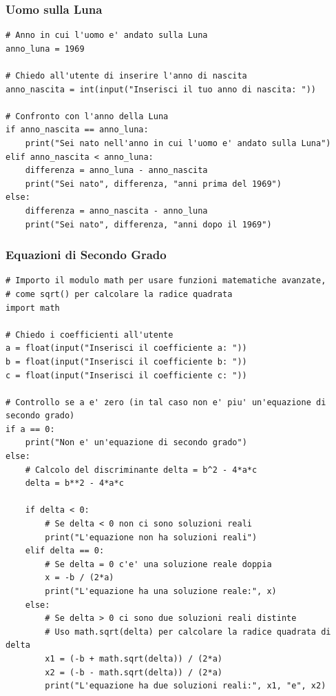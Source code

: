 \documentclass[a4paper,12pt]{article}
\begin{document}
\newpage

\subsubsection{Uomo sulla Luna}
\begin{lstlisting}
# Anno in cui l'uomo e' andato sulla Luna
anno_luna = 1969

# Chiedo all'utente di inserire l'anno di nascita
anno_nascita = int(input("Inserisci il tuo anno di nascita: "))

# Confronto con l'anno della Luna
if anno_nascita == anno_luna:
	print("Sei nato nell'anno in cui l'uomo e' andato sulla Luna")
elif anno_nascita < anno_luna:
	differenza = anno_luna - anno_nascita
	print("Sei nato", differenza, "anni prima del 1969")
else:
	differenza = anno_nascita - anno_luna
	print("Sei nato", differenza, "anni dopo il 1969")

\end{lstlisting}


\newpage
\subsubsection{Equazioni di Secondo Grado}
\begin{lstlisting}
# Importo il modulo math per usare funzioni matematiche avanzate,
# come sqrt() per calcolare la radice quadrata
import math

# Chiedo i coefficienti all'utente
a = float(input("Inserisci il coefficiente a: "))
b = float(input("Inserisci il coefficiente b: "))
c = float(input("Inserisci il coefficiente c: "))

# Controllo se a e' zero (in tal caso non e' piu' un'equazione di secondo grado)
if a == 0:
	print("Non e' un'equazione di secondo grado")
else:
	# Calcolo del discriminante delta = b^2 - 4*a*c
	delta = b**2 - 4*a*c

	if delta < 0:
		# Se delta < 0 non ci sono soluzioni reali
		print("L'equazione non ha soluzioni reali")
	elif delta == 0:
		# Se delta = 0 c'e' una soluzione reale doppia
		x = -b / (2*a)
		print("L'equazione ha una soluzione reale:", x)
	else:
		# Se delta > 0 ci sono due soluzioni reali distinte
		# Uso math.sqrt(delta) per calcolare la radice quadrata di delta
		x1 = (-b + math.sqrt(delta)) / (2*a)
		x2 = (-b - math.sqrt(delta)) / (2*a)
		print("L'equazione ha due soluzioni reali:", x1, "e", x2)
\end{lstlisting}
\end{document}
